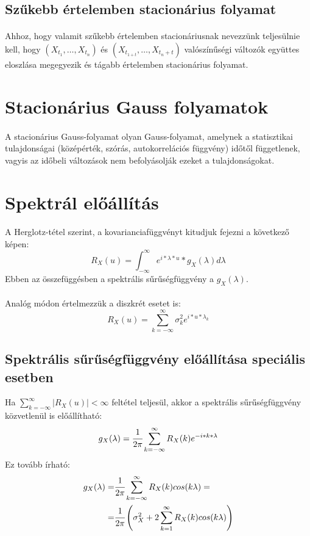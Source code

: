\documentclass[11pt,a4paper]{article}
\begin{document}
			\subsection{Szűkebb értelemben stacionárius folyamat}
				\paragraph{}

				Ahhoz, hogy valamit szűkebb értelemben stacionáriusnak nevezzünk teljesülnie kell, hogy $(X_{t_1}, \dots , X_{t_n})$ és $(X_{t_{1+t}}, \dots, X_{t_n + t})$ valószínűségi változók  együttes eloszlása megegyezik és tágabb értelemben stacionárius folyamat.

		\section{Stacionárius Gauss folyamatok}
			\paragraph{}
				A stacionárius Gauss-folyamat olyan Gauss-folyamat, amelynek a statisztikai tulajdonságai (középérték, szórás, autokorrelációs függvény) időtől függetlenek, vagyis az időbeli változások nem befolyásolják ezeket a tulajdonságokat.
		\section{Spektrál előállítás}
			\paragraph{}
				A Herglotz-tétel szerint, a kovarianciafüggvényt kitudjuk fejezni a következő képen:
				$$R_X (u)=\int_{-\infty}^\infty e^{i*\lambda*u}*g_X(\lambda)d\lambda$$
				Ebben az összefüggésben a spektrális sűrűségfüggvény a $g_X(\lambda)$.
			\paragraph{}
				Analóg módon értelmezzük a diszkrét esetet is:
				$$R_X(u) = \sum_{k = - \infty}^\infty \sigma^2_k e^{i*u* \lambda_k}$$
			\subsection{Spektrális sűrűségfüggvény előállítása speciális esetben}
				Ha $\sum_{k=- \infty}^{\infty}|R_X(u)| < \infty$ feltétel teljesül, akkor a spektrális sűrűségfüggvény közvetlenül is előállítható:
				$$g_X(\lambda) = \cfrac{1}{2 \pi} \sum_{k = - \infty} ^{\infty} R_X(k) e^{-i * k *\lambda}$$
				Ez tovább írható:
				$$
				\begin{aligned}
					g_X(\lambda) =& \cfrac{1}{ 2  \pi} \sum_{k = - \infty}^{\infty}R_X(k)cos(k \lambda) = \\
					=& \cfrac{1}{2 \pi} \left( \sigma_X^2 + 2 \sum_{k = 1}^{\infty} R_X(k) cos(k \lambda) \right)
				\end{aligned}$$
\end{document}
